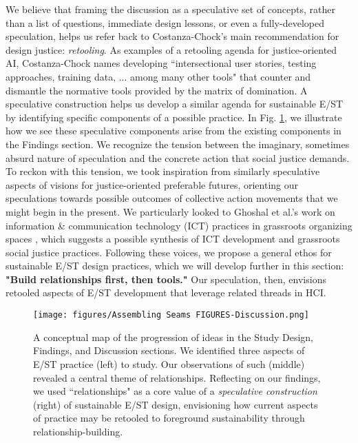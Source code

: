 \documentclass[manuscript,review,anonymous]{acmart}
\begin{document}
We believe that framing the discussion as a speculative set of concepts, rather than a list of questions, immediate design lessons, or even a fully-developed speculation, helps us refer back to Costanza-Chock's main recommendation for design justice: \textit{retooling}. As examples of a retooling agenda for justice-oriented AI, Costanza-Chock names developing ``intersectional user stories, testing approaches, training data, ... among many other tools" \cite{costanza-chock_design_2020} that counter and dismantle the normative tools provided by the matrix of domination. A speculative construction helps us develop a similar agenda for sustainable E/ST by identifying specific components of a possible practice. In Fig. \ref{fig:spec-visioning}, we illustrate how we see these speculative components arise from the existing components in the Findings section. We recognize the tension between the imaginary, sometimes absurd nature of speculation and the concrete action that social justice demands. To reckon with this tension, we took inspiration from similarly speculative aspects of visions for justice-oriented preferable futures, orienting our speculations towards possible outcomes of collective action movements that we might begin in the present. We particularly looked to Ghoshal et al.'s work on information \& communication technology (ICT) practices in grassroots organizing spaces \cite{ghoshal_toward_2020}, which suggests a possible synthesis of ICT development and grassroots social justice practices. Following these voices, we propose a general ethos for sustainable E/ST design practices, which we will develop further in this section: \textbf{"Build relationships first, then tools."} 
Our speculation, then, envisions retooled aspects of E/ST development that leverage related threads in HCI. 


\begin{figure}[ht]
    \centering
    \texttt{[image: figures/Assembling Seams FIGURES-Discussion.png]}
    \caption{%
    A conceptual map of the progression of ideas in the Study Design, Findings, and Discussion sections. We identified three aspects of E/ST practice (left) to study. Our observations of such (middle) revealed a central theme of relationships. Reflecting on our findings, we used ``relationships" as a core value of a \textit{speculative construction} (right) of sustainable E/ST design, envisioning how current aspects of practice may be retooled to foreground sustainability through relationship-building.}
    \label{fig:spec-visioning}
\end{figure}
\end{document}
